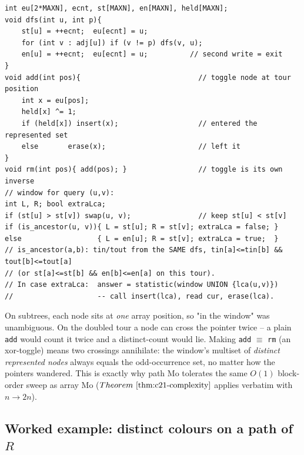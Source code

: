 \begin{lstlisting}[caption={Doubled-tour build, toggle add/rm, and the window setup for a path query. The lca node is fed to the statistic between answering steps in case (ii). ASCII only, no underscores}, label={lst:c21-euler-toggle}]
int eu[2*MAXN], ecnt, st[MAXN], en[MAXN], held[MAXN];
void dfs(int u, int p){
    st[u] = ++ecnt;  eu[ecnt] = u;
    for (int v : adj[u]) if (v != p) dfs(v, u);
    en[u] = ++ecnt;  eu[ecnt] = u;          // second write = exit
}
void add(int pos){                            // toggle node at tour position
    int x = eu[pos];
    held[x] ^= 1;
    if (held[x]) insert(x);                   // entered the represented set
    else       erase(x);                      // left it
}
void rm(int pos){ add(pos); }                 // toggle is its own inverse
// window for query (u,v):
int L, R; bool extraLca;
if (st[u] > st[v]) swap(u, v);                // keep st[u] < st[v]
if (is_ancestor(u, v)){ L = st[u]; R = st[v]; extraLca = false; }
else                  { L = en[u]; R = st[v]; extraLca = true;  }
// is_ancestor(a,b): tin/tout from the SAME dfs, tin[a]<=tin[b] && tout[b]<=tout[a]
// (or st[a]<=st[b] && en[b]<=en[a] on this tour).
// In case extraLca:  answer = statistic(window UNION {lca(u,v)})
//                    -- call insert(lca), read cur, erase(lca).
\end{lstlisting}

\begin{insightbox}
On subtrees, each node sits at \emph{one} array position, so "in the window"
was unambiguous.  On the doubled tour a node can cross the pointer twice --
a plain \texttt{add} would count it twice and a distinct-count would lie.
Making \texttt{add} \(\equiv\) \texttt{rm} (an xor-toggle) means two crossings
annihilate: the window's multiset of \emph{distinct represented nodes} always
equals the odd-occurrence set, no matter how the pointers wandered.  This is
exactly why path Mo tolerates the same \(O(1)\) block-order sweep as array Mo
(\(\thmref{c21-complexity}\) applies verbatim with \(n \to 2n\)).
\end{insightbox}

\subsection{Worked example: distinct colours on a path of \(R\)}

